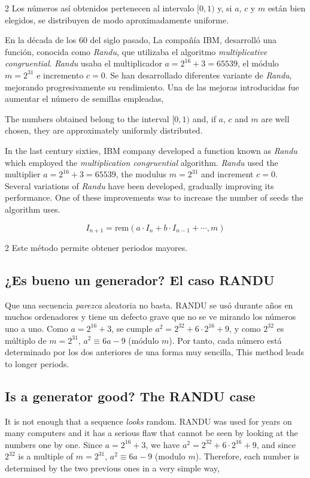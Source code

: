 \begin{paracol}{2}
Los números así obtenidos pertenecen al intervalo $[0,1)$ y, si $a$, $c$ y $m$ están bien elegidos, se distribuyen de modo aproximadamente uniforme. 

En la década de los 60 del siglo pasado, La compañía IBM, desarrolló una función, conocida como \emph{Randu}, que utilizaba el algoritmo \emph{multiplicative congruential}. \emph{Randu} usaba el multiplicador $a=2^{16}+3=65539$, el módulo $m=2^{31}$ e incremento $c=0$. 
Se han desarrollado diferentes variante de \emph{Randu}, mejorando progresivamente su rendimiento. Una de las mejoras introducidas fue aumentar el número de semillas empleadas,

\switchcolumn
The numbers obtained belong to the interval $[0,1)$ and, if $a$, $c$ and $m$ are well chosen, they are approximately uniformly distributed.

In the last century sixties, IBM company developed a function known as \emph{Randu} which employed the \emph{multiplication congruential} algorithm. \emph{Randu} used the multiplier $a=2^{16}+3=65539$, the modulus $m=2^{31}$ and increment $c=0$.
Several variations of \emph{Randu} have been developed, gradually improving its performance. One of these improvements was to increase the number of seeds the algorithm uses.  
\end{paracol}
\begin{equation*}
I_{n+1}=\text{rem}(a\cdot I_n+b\cdot I_{n-1}+\cdots, m)
\end{equation*} 
\begin{paracol}{2}
Este método permite obtener periodos mayores.

\subsection{¿Es bueno un generador? El caso RANDU}\label{sec:randu}
Que una secuencia \emph{parezca} aleatoria no basta. RANDU se usó durante años en muchos ordenadores y tiene un defecto grave que no se ve mirando los números uno a uno. Como $a=2^{16}+3$, se cumple $a^2=2^{32}+6\cdot 2^{16}+9$, y como $2^{32}$ es múltiplo de $m=2^{31}$, $a^2 \equiv 6a-9$ (módulo $m$). Por tanto, cada número está determinado por los dos anteriores de una forma muy sencilla,
\switchcolumn
This method leads to longer periods.

\subsection{Is a generator good? The RANDU case}\label{sec:randu-2}
It is not enough that a sequence \emph{looks} random. RANDU was used for years on many computers and it has a serious flaw that cannot be seen by looking at the numbers one by one. Since $a=2^{16}+3$, we have $a^2=2^{32}+6\cdot 2^{16}+9$, and since $2^{32}$ is a multiple of $m=2^{31}$, $a^2 \equiv 6a-9$ (modulo $m$). Therefore, each number is determined by the two previous ones in a very simple way,
\end{paracol}
